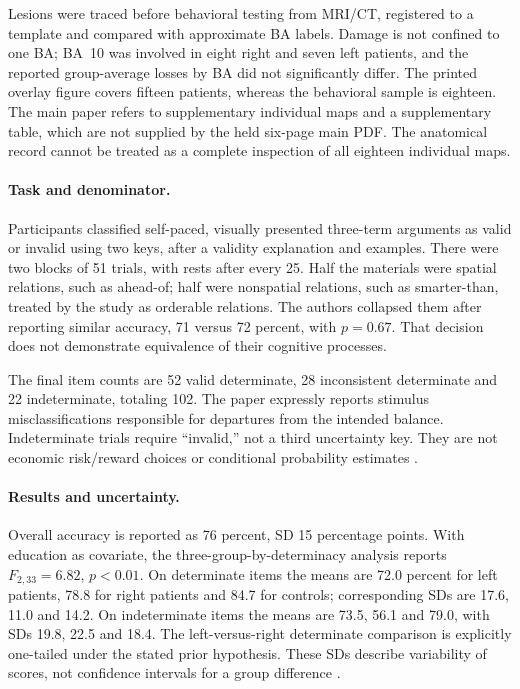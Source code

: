 Lesions were traced before behavioral testing from MRI/CT, registered to
a template and compared with approximate BA labels. Damage is not confined
to one BA; BA~10 was involved in eight right and seven left patients,
and the reported group-average losses by BA did not significantly differ.
The printed overlay figure covers fifteen patients, whereas the behavioral
sample is eighteen. The main paper refers to supplementary individual
maps and a supplementary table, which are not supplied by the held
six-page main PDF. The anatomical record cannot be treated as a complete
inspection of all eighteen individual maps.

\paragraph{Task and denominator.}
Participants classified self-paced, visually presented three-term
arguments as valid or invalid using two keys, after a validity explanation
and examples. There were two blocks of 51 trials, with rests after every
25. Half the materials were spatial relations, such as ahead-of; half
were nonspatial relations, such as smarter-than, treated by the study
as orderable relations. The authors collapsed them after reporting
similar accuracy, 71 versus 72 percent, with \(p=0.67\). That decision
does not demonstrate equivalence of their cognitive processes.

The final item counts are 52 valid determinate, 28 inconsistent
determinate and 22 indeterminate, totaling 102. The paper expressly
reports stimulus misclassifications responsible for departures from the
intended balance. Indeterminate trials require ``invalid,'' not a third
uncertainty key. They are not economic risk/reward choices or conditional
probability estimates \cite[p.~2247]{GoelEtAl2007CertainUncertain}.

\paragraph{Results and uncertainty.}
Overall accuracy is reported as 76 percent, SD 15 percentage points.
With education as covariate, the three-group-by-determinacy analysis
reports \(F_{2,33}=6.82\), \(p<0.01\). On determinate items the means
are 72.0 percent for left patients, 78.8 for right patients and 84.7 for
controls; corresponding SDs are 17.6, 11.0 and 14.2. On indeterminate
items the means are 73.5, 56.1 and 79.0, with SDs 19.8, 22.5 and 18.4.
The left-versus-right determinate comparison is explicitly one-tailed
under the stated prior hypothesis. These SDs describe variability of
scores, not confidence intervals for a group difference
\cite[pp.~2247--2248, fig.~2]{GoelEtAl2007CertainUncertain}.

